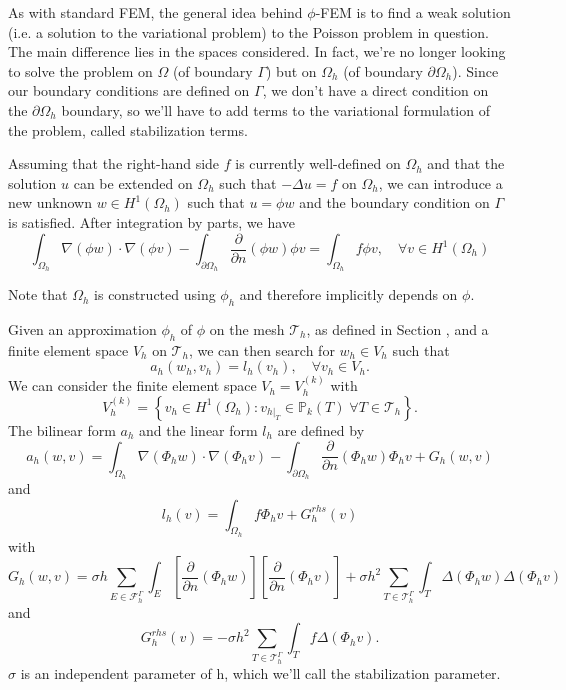 As with standard FEM, the general idea behind $\phi$-FEM is to find a weak solution (i.e. a solution to the variational problem) to the Poisson problem in question. The main difference lies in the spaces considered. In fact, we're no longer looking to solve the problem on $\Omega$ (of boundary $\Gamma$) but on $\Omega_h$ (of boundary $\partial\Omega_h$). Since our boundary conditions are defined on $\Gamma$, we don't have a direct condition on the $\partial\Omega_h$ boundary, so we'll have to add terms to the variational formulation of the problem, called stabilization terms.

Assuming that the right-hand side $f$ is currently well-defined on $\Omega_h$ and that the solution $u$ can be extended on $\Omega_h$ such that $-\Delta u=f$ on $\Omega_h$, we can introduce a new unknown $w\in H^1(\Omega_h)$ such that $u=\phi w$ and the boundary condition on $\Gamma$ is satisfied. After integration by parts, we have
\begin{equation*}
	\int_{\Omega_h}\nabla(\phi w)\cdot\nabla(\phi v)-\int_{\partial\Omega_h}\frac{\partial}{\partial n}(\phi w)\phi v=\int_{\Omega_h} f\phi v,\quad \forall v\in H^1(\Omega_h)
\end{equation*}
\begin{Rem}
	Note that $\Omega_h$ is constructed using $\phi_h$ and therefore implicitly depends on $\phi$.
\end{Rem}
Given an approximation $\phi_h$ of $\phi$ on the mesh $\mathcal{T}_h$, as defined in Section , and a finite element space $V_h$ on $\mathcal{T}_h$, we can then search for $w_h\in V_h$ such that
\begin{equation*}
	a_h(w_h,v_h)=l_h(v_h), \quad \forall v_h\in V_h.
\end{equation*}
We can consider the finite element space $V_h=V_h^{(k)}$ with
\begin{equation*}
	V_h^{(k)}=\left\{v_h\in H^1(\Omega_h):v_{h|_T}\in\mathbb{P}_k(T) \;  \forall T\in\mathcal{T}_h\right\}.
\end{equation*}
The bilinear form $a_h$ and the linear form $l_h$ are defined by
\begin{equation*}
	a_h(w,v)=\int_{\Omega_h} \nabla (\Phi_h w) \cdot \nabla (\Phi_h v) - \int_{\partial\Omega_h} \frac{\partial}{\partial n}(\Phi_h w)\Phi_h v+G_h(w,v)
\end{equation*}
and
\begin{equation*}
	l_h(v)=\int_{\Omega_h} f \Phi_h v + G_h^{rhs}(v)
\end{equation*}
with
\begin{equation*}
G_h(w,v)=\sigma h\sum_{E\in\mathcal{F}_h^\Gamma} \int_E \left[\frac{\partial}{\partial n}(\Phi_h w)\right] \left[\frac{\partial}{\partial n}(\Phi_h v)\right]+\sigma h^2\sum_{T\in\mathcal{T}_h^\Gamma} \int_{T} \Delta(\Phi_h w)\Delta(\Phi_h v)
\end{equation*}
and
\begin{equation*}
G_h^{rhs}(v)=-\sigma h^2\sum_{T\in\mathcal{T}_h^\Gamma} \int_{T} f \Delta(\Phi_h v).
\end{equation*}
$\sigma$ is an independent parameter of h, which we'll call the stabilization parameter.

